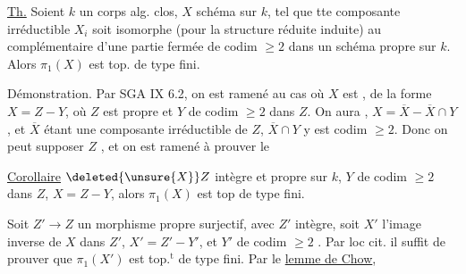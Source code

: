 \uline{Th.} Soient $k$ un corps alg. clos, $X$ schéma 
sur $k$,  tel que tte
composante irréductible $X_i$ soit isomorphe (pour
la structure réduite induite) au 
complémentaire d'une partie fermée de
codim $\geq 2$ dans un schéma propre sur $k$.
Alors $\pi_1(X)$ est top. de type fini.

Démonstration. Par SGA IX 6.2, on est
ramené au cas où $X$ est ,  de
la forme $X=Z-Y$, où $Z$ est propre et $Y$ de
codim $\geq 2$ dans $Z$. On aura ,
$X=\overline X-\overline X\cap Y$, et $\overline X$ étant une composante irréductible de $Z$, $\overline X\cap Y$ y est  codim $\geq 2$. Donc
on peut supposer $Z$ , et on est
ramené à prouver le

\uline{Corollaire} $\deleted{\unsure{X}}Z$ intègre et propre sur $k$, $Y$  de
codim $\geq 2$ dans $Z$, $X=Z-Y$, alors $\pi_1(X)$ est
top de type fini.

Soit $Z'\to Z$ un morphisme propre
surjectif, avec $Z'$ intègre, soit $X'$ l'image
inverse de $X$ dans $Z'$,  $X'=Z'-Y'$, et
$Y'$ de codim $\geq 2$ . Par loc cit. il
suffit de prouver que $\pi_1(X')$ est top.$^{\mathrm t}$
de type fini. Par le \uline{lemme de Chow},
